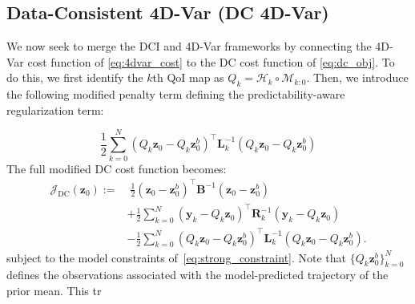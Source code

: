 \documentclass[final,1p,times]{elsarticle}
\begin{document}

\subsection{Data-Consistent 4D-Var (DC 4D-Var)}
We now seek to merge the DCI and 4D-Var frameworks by connecting the 4D-Var cost function of \eqref{eq:4dvar_cost} to the DC cost function of \eqref{eq:dc_obj}.
To do this, we first identify the $k$th QoI map as $Q_k = \mathcal{H}_k \circ\mathcal{M}_{k:0}$.
Then, we introduce the following modified penalty term defining the predictability-aware regularization term:

\begin{equation}
    \frac{1}{2} \sum_{k=0}^{N} \left( Q_k \mathbf{z}_0 - Q_k \mathbf{z}_0^b \right)^\top \mathbf{L}_k^{-1} \left( Q_k \mathbf{z}_0 - Q_k \mathbf{z}_0^b \right) \label{eq:predict_norm}
\end{equation}
The full modified DC cost function becomes:
\begin{equation}
\begin{split}
    \mathcal{J}_{\mathrm{DC}}(\mathbf{z}_0) 
    :=& \;\frac{1}{2} \left( \mathbf{z}_0 - \mathbf{z}_0^b \right)^\top 
        \mathbf{B}^{-1} \left( \mathbf{z}_0 - \mathbf{z}_0^b \right) \\
    &+ \frac{1}{2} \sum_{k=0}^{N} 
        \left( \mathbf{y}_k - Q_k \mathbf{z}_{0} \right)^\top 
        \mathbf{R}_k^{-1} \left( \mathbf{y}_k - Q_k \mathbf{z}_{0} \right) \\
    &- \frac{1}{2} \sum_{k=0}^{N} 
        \left( Q_k \mathbf{z}_{0} - Q_k \mathbf{z}_0^b \right)^\top 
        \mathbf{L}_k^{-1} \left( Q_k \mathbf{z}_{0} - Q_k \mathbf{z}_0^b \right). \label{eq:dc_4dvar_cost}
\end{split}
\end{equation}
subject to the model constraints of~\eqref{eq:strong_constraint}. Note that $\{Q_{k}\mathbf{z}_{0}^{b}\}_{k=0}^{N}$ defines the observations associated with the model-predicted trajectory of the prior mean. This tr
\end{document}
